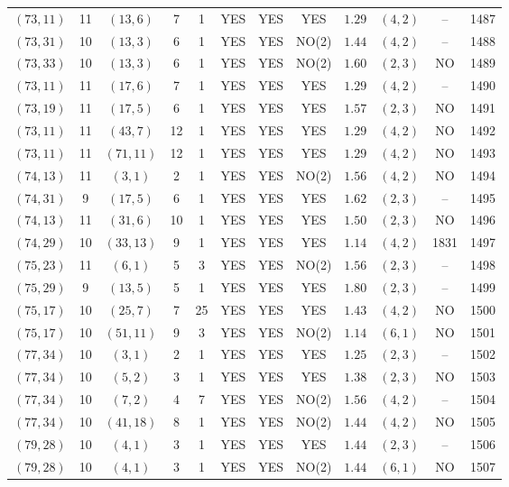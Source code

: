 \begin{longtable}{|c|c|c|c|c|c|c|c|c|c|c|c|}
$(73,11)$ & 11 & $(13,6)$ & 7 & 1 & YES & YES & YES & $1.29$ & $(4,2)$ & -- & 1487\\
$(73,31)$ & 10 & $(13,3)$ & 6 & 1 & YES & YES & NO(2) & $1.44$ & $(4,2)$ & -- & 1488\\
$(73,33)$ & 10 & $(13,3)$ & 6 & 1 & YES & YES & NO(2) & $1.60$ & $(2,3)$ & NO & 1489\\
$(73,11)$ & 11 & $(17,6)$ & 7 & 1 & YES & YES & YES & $1.29$ & $(4,2)$ & -- & 1490\\
$(73,19)$ & 11 & $(17,5)$ & 6 & 1 & YES & YES & YES & $1.57$ & $(2,3)$ & NO & 1491\\
$(73,11)$ & 11 & $(43,7)$ & 12 & 1 & YES & YES & YES & $1.29$ & $(4,2)$ & NO & 1492\\
$(73,11)$ & 11 & $(71,11)$ & 12 & 1 & YES & YES & YES & $1.29$ & $(4,2)$ & NO & 1493\\
$(74,13)$ & 11 & $(3,1)$ & 2 & 1 & YES & YES & NO(2) & $1.56$ & $(4,2)$ & NO & 1494\\
$(74,31)$ & 9 & $(17,5)$ & 6 & 1 & YES & YES & YES & $1.62$ & $(2,3)$ & -- & 1495\\
$(74,13)$ & 11 & $(31,6)$ & 10 & 1 & YES & YES & YES & $1.50$ & $(2,3)$ & NO & 1496\\
$(74,29)$ & 10 & $(33,13)$ & 9 & 1 & YES & YES & YES & $1.14$ & $(4,2)$ & 1831 & 1497\\
$(75,23)$ & 11 & $(6,1)$ & 5 & 3 & YES & YES & NO(2) & $1.56$ & $(2,3)$ & -- & 1498\\
$(75,29)$ & 9 & $(13,5)$ & 5 & 1 & YES & YES & YES & $1.80$ & $(2,3)$ & -- & 1499\\
$(75,17)$ & 10 & $(25,7)$ & 7 & 25 & YES & YES & YES & $1.43$ & $(4,2)$ & NO & 1500\\
$(75,17)$ & 10 & $(51,11)$ & 9 & 3 & YES & YES & NO(2) & $1.14$ & $(6,1)$ & NO & 1501\\
$(77,34)$ & 10 & $(3,1)$ & 2 & 1 & YES & YES & YES & $1.25$ & $(2,3)$ & -- & 1502\\
$(77,34)$ & 10 & $(5,2)$ & 3 & 1 & YES & YES & YES & $1.38$ & $(2,3)$ & NO & 1503\\
$(77,34)$ & 10 & $(7,2)$ & 4 & 7 & YES & YES & NO(2) & $1.56$ & $(4,2)$ & -- & 1504\\
$(77,34)$ & 10 & $(41,18)$ & 8 & 1 & YES & YES & NO(2) & $1.44$ & $(4,2)$ & NO & 1505\\
$(79,28)$ & 10 & $(4,1)$ & 3 & 1 & YES & YES & YES & $1.44$ & $(2,3)$ & -- & 1506\\
$(79,28)$ & 10 & $(4,1)$ & 3 & 1 & YES & YES & NO(2) & $1.44$ & $(6,1)$ & NO & 1507\\

\end{longtable}
